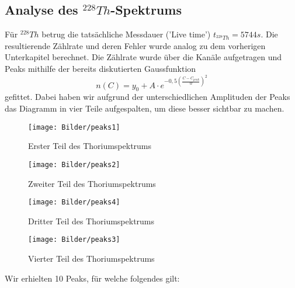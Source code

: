   \subsection{Analyse des $^{228}Th$-Spektrums}
  Für $^{228}Th$ betrug die tatsächliche Messdauer ('Live time') $t_{^{228}Th}=5744 s$. Die resultierende Zählrate und deren Fehler wurde analog zu dem vorherigen Unterkapitel berechnet. Die Zählrate wurde über die Kanäle aufgetragen und Peaks mithilfe der bereits diskutierten Gaussfunktion 
  \[n(C)=y_{0}+A\cdot e^{-0,5(\frac{C-C_{peak}}{w})^{2}}\]
   gefittet. Dabei haben wir aufgrund der unterschiedlichen Amplituden der Peaks das Diagramm in vier Teile aufgespalten, um diese besser sichtbar zu machen.
  \begin{figure}[h]
  \begin{center}
  \texttt{[image: Bilder/peaks1]}
  \caption{Erster Teil des Thoriumspektrums}
  \end{center}
  \end{figure}
  \begin{figure}[h]
    \begin{center}
    \texttt{[image: Bilder/peaks2]}
    \caption{Zweiter Teil des Thoriumspektrums}
    \end{center}
    \end{figure}
    \begin{figure}[h]
      \begin{center}
      \texttt{[image: Bilder/peaks4]}
      \caption{Dritter Teil des Thoriumspektrums}
      \end{center}
      \end{figure}
      \begin{figure}[h]
        \begin{center}
        \texttt{[image: Bilder/peaks3]}
        \caption{Vierter Teil des Thoriumspektrums}
        \end{center}
        \end{figure}
        \clearpage
Wir erhielten 10 Peaks, für welche folgendes gilt:
